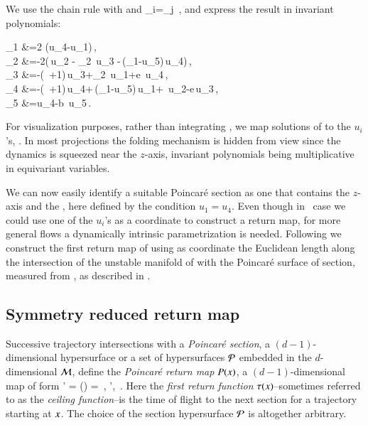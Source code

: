 We use the chain rule with  and 
\beq
 _i=_j
 \,,
and express the result in invariant polynomials:
    \
\beq
\begin{split}
  _1 &=2\,\sigma\,(u_4-u_1)\,,\\
  _2 &=-2\left(\,u_2 - \rho_2\, u_3 -\,(\rho_1-u_5)\,u_4\right)\,,\\
  _3 &=-(\sigma\, +1)\,u_3+\rho_2\, u_1+e\, u_4\,,\\
  _4 &=-(\sigma\, +1)\,u_4+\,(\rho_1-u_5)\,u_1+\sigma\, u_2-e\,u_3\,,\\
  \dot{u}_5 &=u_4-b\, u_5\,.
\end{split}
\label{eq:CLEip}
\eeq
For visualization purposes, rather than integrating
, we map solutions of  to the
$u_i$'s, . In most projections the folding
mechanism is hidden from view since the dynamics is squeezed
near the $z$-axis, invariant polynomials being multiplicative
in equivariant variables.

We can now easily identify a suitable Poincar\'e
section as one that contains the $z$-axis and
the \reqv, here defined by the condition $u_1=u_4$.
Even though in \cLe\ case we could use one of the $u_i$'s as
a coordinate to construct a return map, for more general flows
a dynamically intrinsic parametrization is needed.
Following  we construct the first return map
of \reffig{fig:CLEipRM} using as coordinate the
Euclidean length along the intersection of the unstable
manifold of  with the Poincar\'e surface of section,
measured from \REQV{}{1}, as described in .


\subsection{\label{s:Poincare}Symmetry reduced return map}

Successive trajectory intersections with a {\em Poincar\'e
section}, a $(d-1)$-dim\-ens\-ion\-al hypersurface
or a set of
hypersurfaces ${\cal P}$ embedded in the $d$-dim\-ens\-ion\-al
{\statesp} ${\cal M}$, define the {\em Poincar\'e return map}
$P({x})$, a $(d-1)$-dim\-ens\-ion\-al map of form
\beq
\ssp' = \PoincM({\ssp})
          =  \flow{\tau(\ssp)}{\ssp}
\,,\qquad
\ssp', \ssp \in \PoincS
\,.
Here the {\em first return function} $\tau(x)$--sometimes
referred to as the {\em ceiling function}--is the time of
flight to the next section for a trajectory starting at $x$.
The choice of the section hypersurface ${\cal P}$ is altogether
arbitrary. 

